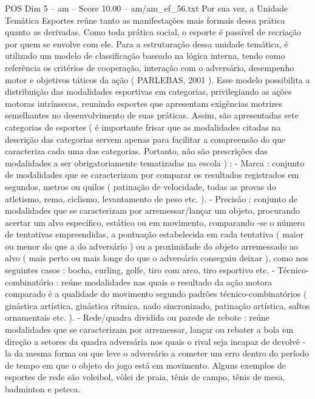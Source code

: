 \begin{textsample}{POS Dim 5 – am – Score 10.00 – am/am\_ef\_56.txt}
Por sua vez, a Unidade Temática Esportes reúne tanto as manifestações mais formais dessa prática quanto as derivadas.
Como toda prática social, o esporte é passível de recriação por quem se envolve com ele.
Para a estruturação dessa unidade temática, é utilizado um modelo de classificação baseado na lógica interna, tendo como referência os critérios de cooperação, interação com o adversário, desempenho motor e objetivos táticos da ação ( PARLEBAS, 2001 ).
Esse modelo possibilita a distribuição das modalidades esportivas em categorias, privilegiando as ações motoras intrínsecas, reunindo esportes que apresentam exigências motrizes semelhantes no desenvolvimento de suas práticas.
Assim, são apresentadas sete categorias de esportes ( é importante frisar que as modalidades citadas na descrição das categorias servem apenas para facilitar a compreensão do que caracteriza cada uma das categorias.
Portanto, não são prescrições das modalidades a ser obrigatoriamente tematizadas na escola ) : - Marca : conjunto de modalidades que se caracterizam por comparar os resultados registrados em segundos, metros ou quilos ( patinação de velocidade, todas as provas do atletismo, remo, ciclismo, levantamento de peso etc. ). - Precisão : conjunto de modalidades que se caracterizam por arremessar/lançar um objeto, procurando acertar um alvo específico, estático ou em movimento, comparando -se o número de tentativas empreendidas, a pontuação estabelecida em cada tentativa ( maior ou menor do que a do adversário ) ou a proximidade do objeto arremessado ao alvo ( mais perto ou mais longe do que o adversário conseguiu deixar ), como nos seguintes casos : bocha, curling, golfe, tiro com arco, tiro esportivo etc. - Técnico-combinatório : reúne modalidades nas quais o resultado da ação motora comparado é a qualidade do movimento segundo padrões técnico-combinatórios ( ginástica artística, ginástica rítmica, nado sincronizado, patinação artística, saltos ornamentais etc. ). - Rede/quadra dividida ou parede de rebote : reúne modalidades que se caracterizam por arremessar, lançar ou rebater a bola em direção a setores da quadra adversária nos quais o rival seja incapaz de devolvê -la da mesma forma ou que leve o adversário a cometer um erro dentro do período de tempo em que o objeto do jogo está em movimento.
Alguns exemplos de esportes de rede são voleibol, vôlei de praia, tênis de campo, tênis de mesa, badminton e peteca.

\end{textsample}
